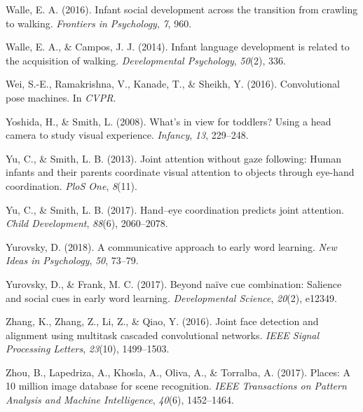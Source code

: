 \documentclass[english,man]{apa6}
\begin{document}
\hypertarget{ref-walle2016infant}{}
Walle, E. A. (2016). Infant social development across the transition
from crawling to walking. \emph{Frontiers in Psychology}, \emph{7}, 960.

\hypertarget{ref-walle2014}{}
Walle, E. A., \& Campos, J. J. (2014). Infant language development is
related to the acquisition of walking. \emph{Developmental Psychology},
\emph{50}(2), 336.

\hypertarget{ref-wei2016cpm}{}
Wei, S.-E., Ramakrishna, V., Kanade, T., \& Sheikh, Y. (2016).
Convolutional pose machines. In \emph{CVPR}.

\hypertarget{ref-yoshida2008}{}
Yoshida, H., \& Smith, L. (2008). What's in view for toddlers? Using a
head camera to study visual experience. \emph{Infancy}, \emph{13},
229--248.

\hypertarget{ref-yu2013joint}{}
Yu, C., \& Smith, L. B. (2013). Joint attention without gaze following:
Human infants and their parents coordinate visual attention to objects
through eye-hand coordination. \emph{PloS One}, \emph{8}(11).

\hypertarget{ref-yu2017hand}{}
Yu, C., \& Smith, L. B. (2017). Hand--eye coordination predicts joint
attention. \emph{Child Development}, \emph{88}(6), 2060--2078.

\hypertarget{ref-yurovsky2018communicative}{}
Yurovsky, D. (2018). A communicative approach to early word learning.
\emph{New Ideas in Psychology}, \emph{50}, 73--79.

\hypertarget{ref-yurovsky2017beyond}{}
Yurovsky, D., \& Frank, M. C. (2017). Beyond naïve cue combination:
Salience and social cues in early word learning. \emph{Developmental
Science}, \emph{20}(2), e12349.

\hypertarget{ref-zhang2016}{}
Zhang, K., Zhang, Z., Li, Z., \& Qiao, Y. (2016). Joint face detection
and alignment using multitask cascaded convolutional networks.
\emph{IEEE Signal Processing Letters}, \emph{23}(10), 1499--1503.

\hypertarget{ref-zhou2017places}{}
Zhou, B., Lapedriza, A., Khosla, A., Oliva, A., \& Torralba, A. (2017).
Places: A 10 million image database for scene recognition. \emph{IEEE
Transactions on Pattern Analysis and Machine Intelligence},
\emph{40}(6), 1452--1464.

\endgroup
\end{document}

